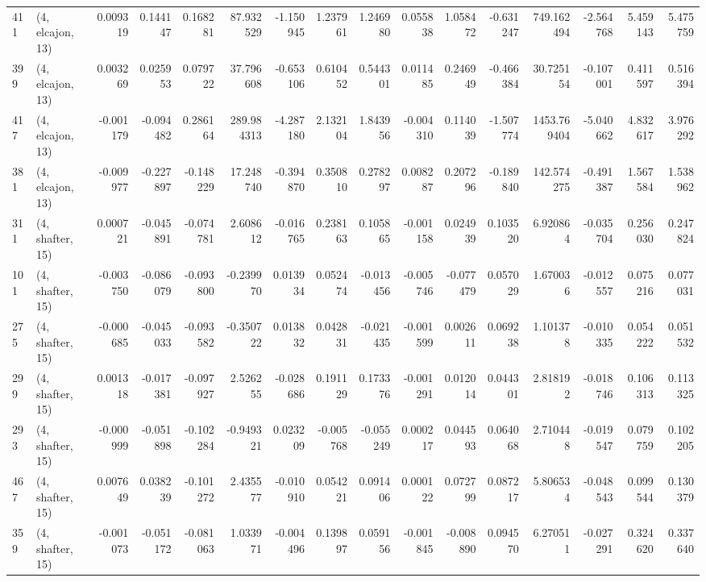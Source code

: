 \begin{tabular}{llrrrrrrrrrrrrrr}
411 &  (4, elcajon, 13) &   0.009319 &  0.144147 &  0.168281 &   87.932529 & -1.150945 &   1.237961 &  1.246980 &  0.055838 &  1.058472 & -0.631247 &   749.162494 & -2.564768 &  5.459143 &  5.475759 \\
399 &  (4, elcajon, 13) &   0.003269 &  0.025953 &  0.079722 &   37.796608 & -0.653106 &   0.610452 &  0.544301 &  0.011485 &  0.246949 & -0.466384 &    30.725154 & -0.107001 &  0.411597 &  0.516394 \\
417 &  (4, elcajon, 13) &  -0.001179 & -0.094482 &  0.286164 &  289.984313 & -4.287180 &   2.132104 &  1.843956 & -0.004310 &  0.114039 & -1.507774 &  1453.769404 & -5.040662 &  4.832617 &  3.976292 \\
381 &  (4, elcajon, 13) &  -0.009977 & -0.227897 & -0.148229 &   17.248740 & -0.394870 &   0.350810 &  0.278297 &  0.008287 &  0.207296 & -0.189840 &   142.574275 & -0.491387 &  1.567584 &  1.538962 \\
311 &  (4, shafter, 15) &   0.000721 & -0.045891 & -0.074781 &    2.608612 & -0.016765 &   0.238163 &  0.105865 & -0.001158 &  0.024939 &  0.103520 &     6.920864 & -0.035704 &  0.256030 &  0.247824 \\
101 &  (4, shafter, 15) &  -0.003750 & -0.086079 & -0.093800 &   -0.239970 &  0.013934 &   0.052474 & -0.013456 & -0.005746 & -0.077479 &  0.057029 &     1.670036 & -0.012557 &  0.075216 &  0.077031 \\
275 &  (4, shafter, 15) &  -0.000685 & -0.045033 & -0.093582 &   -0.350722 &  0.013832 &   0.042831 & -0.021435 & -0.001599 &  0.002611 &  0.069238 &     1.101378 & -0.010335 &  0.054222 &  0.051532 \\
299 &  (4, shafter, 15) &   0.001318 & -0.017381 & -0.097927 &    2.526255 & -0.028686 &   0.191129 &  0.173376 & -0.001291 &  0.012014 &  0.044301 &     2.818192 & -0.018746 &  0.106313 &  0.113325 \\
293 &  (4, shafter, 15) &  -0.000999 & -0.051898 & -0.102284 &   -0.949321 &  0.023209 &  -0.005768 & -0.055249 &  0.000217 &  0.044593 &  0.064068 &     2.710448 & -0.019547 &  0.079759 &  0.102205 \\
467 &  (4, shafter, 15) &   0.007649 &  0.038239 & -0.101272 &    2.435577 & -0.010910 &   0.054221 &  0.091406 &  0.000122 &  0.072799 &  0.087217 &     5.806534 & -0.048543 &  0.099544 &  0.130379 \\
359 &  (4, shafter, 15) &  -0.001073 & -0.051172 & -0.081063 &    1.033971 & -0.004496 &   0.139897 &  0.059156 & -0.001845 & -0.008890 &  0.094570 &     6.270511 & -0.027291 &  0.324620 &  0.337640 \\

\end{tabular}
